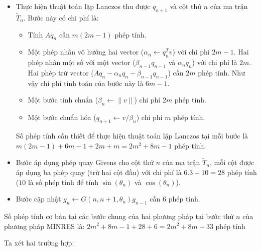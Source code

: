 \documentclass[14pt, a4paper]{article}
\numberwithin{equation}{section}
\numberwithin{algorithm}{section}
\numberwithin{figure}{section}
\numberwithin{dl}{section}
\numberwithin{md}{section}
\numberwithin{bd}{section}
\numberwithin{dn}{section}
\numberwithin{hq}{section}
\begin{document}
\begin{itemize}
    \item Thực hiện thuật toán lặp Lanczos thu được $q_{n+1}$ và cột thứ $n$ của ma trận $\widetilde{T}_n$. Bước này có chi phí là:
    \begin{itemize}
        \item Tính $Aq_n$ cần $m(2m-1)$ phép tính.
        \item Một phép nhân vô hướng hai vector ($\alpha_n \leftarrow q_n^Tv$) với chi phí $2m-1$. Hai phép nhân một số với một vector ($\beta_{n-1}q_{n-1}$ và $\alpha_n q_n$) với chi phí là $2m$. Hai phép trừ vector ($Aq_n - \alpha_n q_n - \beta_{n-1} q_{n-1}$) cần $2m$ phép tính. Như vậy chi phí tính toán của bước này là $6m-1$.
        \item Một bước tính chuẩn ($\beta_n \leftarrow \lVert v \rVert$) chi phí $2m$ phép tính.
        \item Một bước chuẩn hóa ($q_{n+1} \leftarrow v/\beta_n$) chi phí $m$ phép tính.
    \end{itemize}
    Số phép tính cần thiết để thực hiện thuật toán lặp Lanczos tại mỗi bước là $m(2m-1) + 6m-1 + 2m + m=2m^2+8m-1$ phép tính.
    \item Bước áp dụng phép quay Givens cho cột thứ $n$ của ma trận $\widetilde{T}_n$, mỗi cột được áp dụng ba phép quay (trừ hai cột đầu) với chi phí là $6.3+10=28$ phép tính ($10$ là số phép tính để tính $\sin(\theta_n)$ và $\cos(\theta_n)$).
    \item Bước cập nhật $g_n \leftarrow G(n, n+1, \theta_n)g_{n-1}$ cần 6 phép tính.
\end{itemize}
Số phép tính cơ bản tại các bước chung của hai phương pháp tại bước thứ $n$ của phương pháp MINRES là: $2m^2 + 8m-1 + 28 + 6=2m^2 + 8m + 33$ phép tính

Ta xét hai trường hợp:
\end{document}
